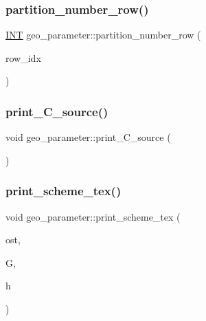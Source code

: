 \mbox{\label{classgeo__parameter_a1079d2893d23d9462bc965f7530f2943}} 
\subsubsection{\texorpdfstring{partition\+\_\+number\+\_\+row()}{partition\_number\_row()}}
{\footnotesize\ttfamily \mbox{\hyperlink{galois_8h_a09fddde158a3a20bd2dcadb609de11dc}{I\+NT}} geo\+\_\+parameter\+::partition\+\_\+number\+\_\+row (\begin{DoxyParamCaption}\item[{\mbox{\hyperlink{galois_8h_a09fddde158a3a20bd2dcadb609de11dc}{I\+NT}}}]{row\+\_\+idx }\end{DoxyParamCaption})}

\mbox{\label{classgeo__parameter_adaabcb412bef1d21a8233b9df671a178}} 
\subsubsection{\texorpdfstring{print\+\_\+\+C\+\_\+source()}{print\_C\_source()}}
{\footnotesize\ttfamily void geo\+\_\+parameter\+::print\+\_\+\+C\+\_\+source (\begin{DoxyParamCaption}{ }\end{DoxyParamCaption})}

\mbox{\label{classgeo__parameter_a104c98d07fca47339b49c9acb42e5efe}} 
\subsubsection{\texorpdfstring{print\+\_\+scheme\+\_\+tex()}{print\_scheme\_tex()}}
{\footnotesize\ttfamily void geo\+\_\+parameter\+::print\+\_\+scheme\+\_\+tex (\begin{DoxyParamCaption}\item[{ostream \&}]{ost,  }\item[{\mbox{\hyperlink{classtdo__scheme}{tdo\+\_\+scheme}} \&}]{G,  }\item[{\mbox{\hyperlink{galois_8h_a09fddde158a3a20bd2dcadb609de11dc}{I\+NT}}}]{h }\end{DoxyParamCaption})}

